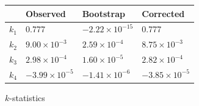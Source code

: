 \documentclass[11pt]{amsart}
\begin{document}
\newpage
\begin{figure}
    \begin{tabular}{ l | l | l | l }
    & Observed & Bootstrap & Corrected \\ \hline
$k_1$ & 0.777 & $-2.22\times 10^{-15}$& 0.777\\
$k_2$ & $9.00\times 10^{-3}$  &$2.59\times 10^{-4}$ & $8.75\times 10^{-3}$\\
$k_3$ & $2.98\times 10^{-4}$ & $1.60\times 10^{-5}$ & $2.82\times 10^{-4}$\\
$k_4$ & $-3.99\times10^{-5}$ & $-1.41\times 10^{-6}$ & $-3.85\times 10^{-5}$\\
    \end{tabular}
    \caption{$k$-statistics}
    \label{table:k_stats}
\end{figure}





\end{document}

